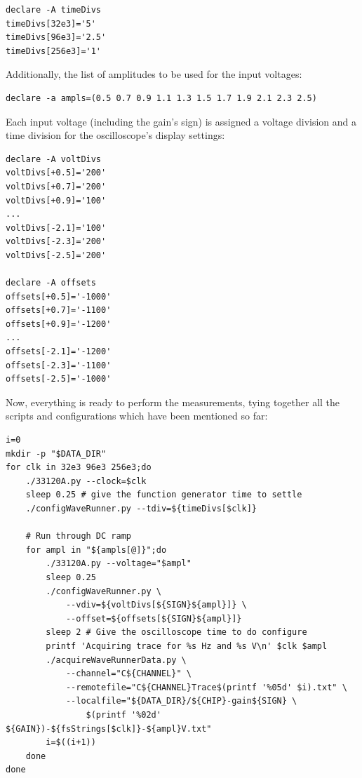 \begin{verbatim}
declare -A timeDivs
timeDivs[32e3]='5'
timeDivs[96e3]='2.5'
timeDivs[256e3]='1'
\end{verbatim}


Additionally, the list of amplitudes to be used for the input voltages:

\begin{verbatim}
declare -a ampls=(0.5 0.7 0.9 1.1 1.3 1.5 1.7 1.9 2.1 2.3 2.5)
\end{verbatim}

Each input voltage (including the gain's  sign) is assigned a voltage division
and a time division for the oscilloscope's display settings\footnotemark:

\begin{verbatim}
declare -A voltDivs
voltDivs[+0.5]='200'
voltDivs[+0.7]='200'
voltDivs[+0.9]='100'
...
voltDivs[-2.1]='100'
voltDivs[-2.3]='200'
voltDivs[-2.5]='200'

declare -A offsets
offsets[+0.5]='-1000'
offsets[+0.7]='-1100'
offsets[+0.9]='-1200'
...
offsets[-2.1]='-1200'
offsets[-2.3]='-1100'
offsets[-2.5]='-1000'
\end{verbatim}


Now, everything is  ready to perform the measurements, tying  together all the
scripts and configurations which have been mentioned so far:

\begin{verbatim}
i=0
mkdir -p "$DATA_DIR"
for clk in 32e3 96e3 256e3;do
    ./33120A.py --clock=$clk
    sleep 0.25 # give the function generator time to settle
    ./configWaveRunner.py --tdiv=${timeDivs[$clk]}

    # Run through DC ramp
    for ampl in "${ampls[@]}";do
        ./33120A.py --voltage="$ampl"
        sleep 0.25
        ./configWaveRunner.py \
            --vdiv=${voltDivs[${SIGN}${ampl}]} \
            --offset=${offsets[${SIGN}${ampl}]}
        sleep 2 # Give the oscilloscope time to do configure
        printf 'Acquiring trace for %s Hz and %s V\n' $clk $ampl
        ./acquireWaveRunnerData.py \
            --channel="C${CHANNEL}" \
            --remotefile="C${CHANNEL}Trace$(printf '%05d' $i).txt" \
            --localfile="${DATA_DIR}/${CHIP}-gain${SIGN} \
                $(printf '%02d' ${GAIN})-${fsStrings[$clk]}-${ampl}V.txt"
        i=$((i+1))
    done
done
\end{verbatim}

